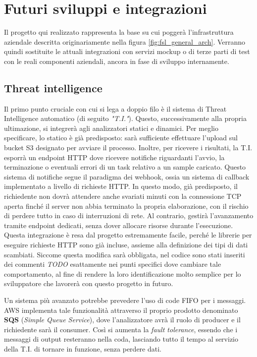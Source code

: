 \chapter{Futuri sviluppi e integrazioni}
Il progetto qui realizzato rappresenta la base su cui poggerà l'infrastruttura aziendale descritta originariamente nella figura \ref{fig:fsl_general_arch}.
Verranno quindi sostituite le attuali integrazioni con servizi mockup o di terze parti di test con le reali componenti aziendali, ancora in fase di sviluppo internamente.

\section{Threat intelligence}
Il primo punto cruciale con cui si lega a doppio filo è il sistema di Threat Intelligence automatico (di seguito \emph{"T.I."}). Questo, successivamente alla propria ultimazione, si integrerà agli analizzatori statici e dinamici.
Per meglio specificare, lo statico è già predisposto: sarà sufficiente effettuare l'upload sul bucket S3 designato per avviare il processo. Inoltre, per ricevere i risultati, la T.I. esporrà un endpoint HTTP dove ricevere notifiche riguardanti l'avvio, la terminazione o eventuali errori di un task relativo a un sample caricato.
Questo sistema di notifiche segue il paradigma dei webhook, ossia un sistema di callback implementato a livello di richieste HTTP. In questo modo, già predisposto, il richiedente non dovrà attendere anche svariati minuti con la connessione TCP aperta finché il server non abbia terminato la propria elaborazione, con il rischio di perdere tutto in caso di interruzioni di rete. Al contrario, gestirà l'avanzamento tramite endpoint dedicati, senza dover allocare risorse durante l'esecuzione.
Questa integrazione è resa dal progetto estremamente facile, perché le librerie per eseguire richieste HTTP sono già incluse, assieme alla definizione dei tipi di dati scambiati.
Siccome questa modifica sarà obbligata, nel codice sono stati inseriti dei commenti \emph{TODO} esattamente nei punti specifici dove cambiare tale comportamento, al fine di rendere la loro identificazione molto semplice per lo sviluppatore che lavorerà con questo progetto in futuro.

Un sistema più avanzato potrebbe prevedere l'uso di code FIFO per i messaggi. AWS implementa tale funzionalità attraverso il proprio prodotto denominato \textbf{SQS} (\emph{Simple Queue Service}), dove l'analizzatore avrà il ruolo di producer e il richiedente sarà il consumer. Così si aumenta la \emph{fault tolerance}, essendo che i messaggi di output resteranno nella coda, lasciando tutto il tempo al servizio della T.I. di tornare in funzione, senza perdere dati.


